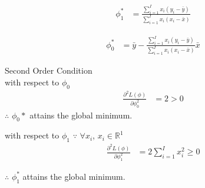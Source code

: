\documentclass[10pt]{article}
\begin{document}
\begin{enumerate}
	\begin{align*}
	\phi_1^* &= \frac{\sum_{i=1}^{I}x_i(y_i-\bar{y})}{\sum_{i=1}^{I}x_i(x_i-\bar{x})}
	\end{align*}
	
	\begin{align*}
	\phi_0^* &= \bar{y}- \frac{\sum_{i=1}^{I}x_i(y_i-\bar{y})}{\sum_{i=1}^{I}x_i(x_i-\bar{x})}\bar{x}
	\end{align*}
	
	Second Order Condition \\
	with respect to $\phi_0$
	\begin{align*}
	\frac{\partial^2 L(\phi)}{\partial \phi_0^2} &= 2 > 0
	\end{align*}
	$\therefore$ $\phi_0*$ attains the global minimum.
	
	with respect to $\phi_1$
	$\because$ $\forall x_i$, $x_i \in \mathbb{R}^1$
	\begin{align*}
	\frac{\partial^2 L(\phi)}{\partial \phi_1^2} &= 2\sum_{i=1}^Ix_i^2 \geq 0
	\end{align*}
	
	$\therefore$ $\phi_1^*$ attains the global minimum.

\end{enumerate}
\end{document}
